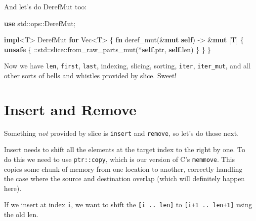 \documentclass[a4paper,]{book}
\newenvironment{Shaded}{\begin{snugshade}}{\end{snugshade}}
\newcommand{\KeywordTok}[1]{\textcolor[rgb]{0.13,0.29,0.53}{\textbf{{#1}}}}
\newcommand{\NormalTok}[1]{{#1}}
\begin{document}
And let's do DerefMut too:

\begin{Shaded}
\begin{Highlighting}[]
\KeywordTok{use} \NormalTok{std::ops::DerefMut;}

\KeywordTok{impl}\NormalTok{<T> DerefMut }\KeywordTok{for} \NormalTok{Vec<T> \{}
    \KeywordTok{fn} \NormalTok{deref_mut(&}\KeywordTok{mut} \KeywordTok{self}\NormalTok{) -> &}\KeywordTok{mut} \NormalTok{[T] \{}
        \KeywordTok{unsafe} \NormalTok{\{}
            \NormalTok{::std::slice::from_raw_parts_mut(*}\KeywordTok{self}\NormalTok{.ptr, }\KeywordTok{self}\NormalTok{.len)}
        \NormalTok{\}}
    \NormalTok{\}}
\NormalTok{\}}
\end{Highlighting}
\end{Shaded}

Now we have \texttt{len}, \texttt{first}, \texttt{last}, indexing,
slicing, sorting, \texttt{iter}, \texttt{iter\_mut}, and all other sorts
of bells and whistles provided by slice. Sweet!

\section{Insert and Remove}\label{sec--vec-insert-remove}

Something \emph{not} provided by slice is \texttt{insert} and
\texttt{remove}, so let's do those next.

Insert needs to shift all the elements at the target index to the right
by one. To do this we need to use \texttt{ptr::copy}, which is our
version of C's \texttt{memmove}. This copies some chunk of memory from
one location to another, correctly handling the case where the source
and destination overlap (which will definitely happen here).

If we insert at index \texttt{i}, we want to shift the
\texttt{{[}i\ ..\ len{]}} to \texttt{{[}i+1\ ..\ len+1{]}} using the old
len.
\end{document}
